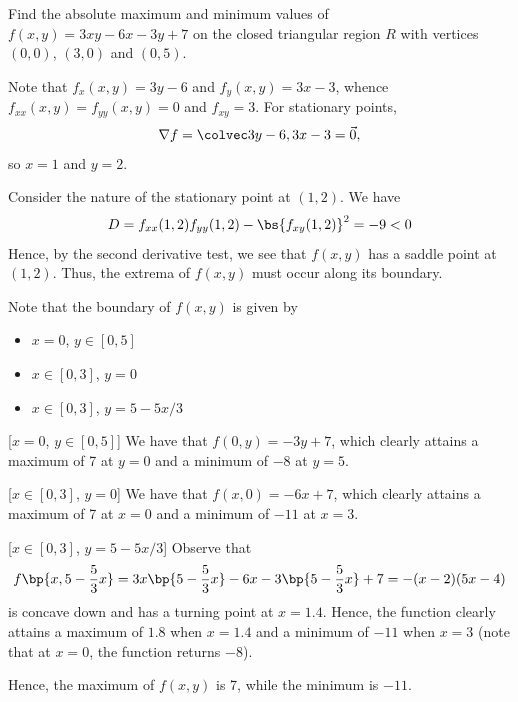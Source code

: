 \begin{problem}
    Find the absolute maximum and minimum values of $f(x, y) = 3xy - 6x - 3y + 7$ on the closed triangular region $R$ with vertices $(0, 0)$, $(3, 0)$ and $(0, 5)$.
\end{problem}
\begin{solution}
    Note that $f_x(x, y) = 3y - 6$ and $f_y(x, y) = 3x - 3$, whence $f_{xx}(x, y) = f_{yy}(x, y) = 0$ and $f_{xy} = 3$. For stationary points, \[\nabla f = \cvecii{3y-6}{3x-3} = \vec 0,\] so $x = 1$ and $y = 2$.

    Consider the nature of the stationary point at $(1, 2)$. We have \[D = f_{xx}(1, 2)f_{yy}(1, 2) - \bs{f_{xy}(1, 2)}^2 = -9 < 0\] Hence, by the second derivative test, we see that $f(x, y)$ has a saddle point at $(1, 2)$. Thus, the extrema of $f(x, y)$ must occur along its boundary.

    Note that the boundary of $f(x, y)$ is given by
    \begin{itemize}
        \item $x = 0$, $y \in [0, 5]$
        \item $x \in [0, 3]$, $y = 0$
        \item $x \in [0, 3]$, $y = 5 - 5x/3$
    \end{itemize}

    [$x = 0$, $y \in [0,5]$] We have that $f(0, y) = -3y + 7$, which clearly attains a maximum of 7 at $y = 0$ and a minimum of $-8$ at $y = 5$.

    [$x \in [0, 3]$, $y = 0$] We have that $f(x, 0) = -6x + 7$, which clearly attains a maximum of 7 at $x = 0$ and a minimum of $-11$ at $x = 3$.

    [$x \in [0, 3]$, $y = 5 - 5x/3$] Observe that \[f\bp{x, 5 - \frac53 x} = 3x\bp{5 - \frac53 x} - 6x - 3\bp{5 - \frac53 x} + 7 = -(x-2)(5x-4)\] is concave down and has a turning point at $x = 1.4$. Hence, the function clearly attains a maximum of $1.8$ when $x = 1.4$ and a minimum of $-11$ when $x = 3$ (note that at $x = 0$, the function returns $-8$). 

    Hence, the maximum of $f(x, y)$ is 7, while the minimum is $-11$.
\end{solution}

